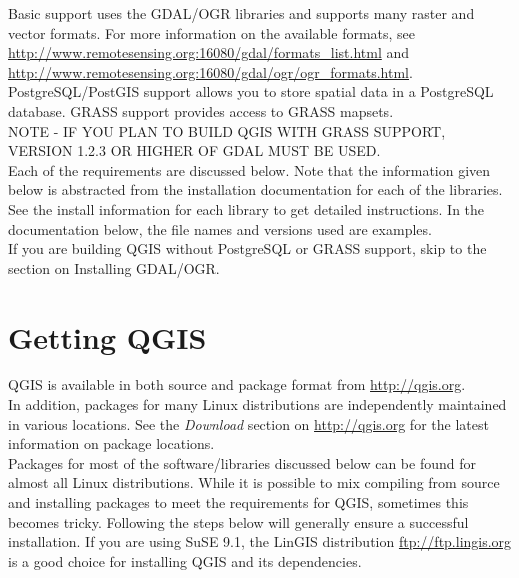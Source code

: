 \documentclass[a4paper,10pt]{article}
\begin{document}
Basic support uses the GDAL/OGR libraries and supports many raster and vector formats. For more information on the available formats, see \url{http://www.remotesensing.org:16080/gdal/formats\_list.html} and \url{http://www.remotesensing.org:16080/gdal/ogr/ogr\_formats.html}.\\

PostgreSQL/PostGIS support allows you to store spatial data in a PostgreSQL database. GRASS support provides access to GRASS mapsets. \\

\textsc{NOTE - IF YOU PLAN TO BUILD QGIS WITH GRASS SUPPORT, VERSION 1.2.3 OR HIGHER
OF GDAL MUST BE USED. }\\
  
  Each of the requirements are discussed below. Note that the information given below is abstracted from the installation documentation for each of the libraries. See the install information for each library to get detailed instructions. In the documentation below, the file names and versions used are examples.
\\

If you are building QGIS without PostgreSQL or GRASS support, skip to the section on Installing GDAL/OGR. 
\section{Getting QGIS}
QGIS is available in both source and package format from \url{http://qgis.org}. \\

In addition, packages for many Linux distributions are independently maintained in various locations. See 
the \textit{Download} section on \url{http://qgis.org} for the latest information on package locations.\\

Packages for most of the software/libraries discussed below can be found for almost all Linux distributions. While it is possible to mix compiling from source and installing packages to meet the requirements for QGIS, sometimes this becomes tricky. Following the steps below will generally ensure a successful installation. If you are using SuSE 9.1, the LinGIS distribution \url{ftp://ftp.lingis.org} is a good choice for installing QGIS and its dependencies.
\end{document}
